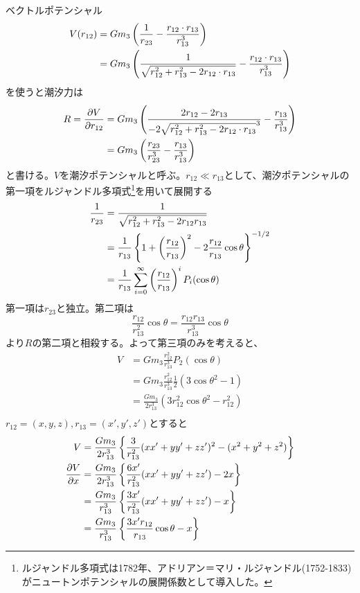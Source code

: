     ベクトルポテンシャル
    \begin{align*}
        V(r_{12}) &= Gm_3\lr{ \frac{1}{r_{23}} - \frac{r_{12}\cdot r_{13}}{r_{13}^3} }\\
        &= Gm_3\lr{ \frac{1}{\sqrt{ r_{12}^2 + r_{13}^2 - 2r_{12}\cdot r_{13}}} - \frac{r_{12}\cdot r_{13}}{r_{13}^3} }\\
    \end{align*}
    を使うと潮汐力は
    \begin{align*}
        R = \pd[V]{r_{12}} &= Gm_3\lr{ \frac{2r_{12} - 2r_{13}}{-2\sqrt{ r_{12}^2 + r_{13}^2 - 2r_{12}\cdot r_{13}}^3} - \frac{r_{13}}{r_{13}^3} }\\
        &= Gm_3\lr{ \frac{r_{23}}{r_{23}^3} - \frac{r_{13}}{r_{13}^3} }
    \end{align*}
    と書ける。$V$を潮汐ポテンシャルと呼ぶ。$r_{12} \ll r_{13}$として、潮汐ポテンシャルの第一項をルジャンドル多項式\footnote{ルジャンドル多項式は1782年、アドリアン＝マリ・ルジャンドル(1752-1833)がニュートンポテンシャルの展開係数として導入した。}を用いて展開する
    \begin{align*}
        \frac{1}{r_{23}}
        &= \frac{1}{\sqrt{ r_{12}^2 + r_{13}^2 - 2r_{12}r_{13} }}\\
        &= \frac{1}{r_{13}}\mlr{ 1 + \lr{ \frac{r_{12}}{r_{13}} }^2 - 2\frac{r_{12}}{r_{13}}\cos\theta }^{-1/2}\\
        &= \frac{1}{r_{13}}\sum_{i = 0}^\infty \lr{\frac{r_{12}}{r_{13}}}^iP_i(\cos\theta)
    \end{align*}
    第一項は$r_{23}$と独立。第二項は
        \[\frac{r_{12}}{r_{13}^2}\cos\theta = \frac{r_{12}r_{13}}{r_{13}^3}\cos\theta\]
    より$R$の第二項と相殺する。よって第三項のみを考えると、
    \begin{align*}
        V &= Gm_3\frac{r_{12}^2}{r_{13}^3}P_2(\cos\theta)\\
        &= Gm_3\frac{r_{12}^2}{r_{13}^3}\frac{1}{2}(3\cos\theta^2 - 1)\\
        &= \frac{Gm_3}{2r_{13}^3}(3r_{12}^2\cos\theta^2 - r_{12}^2)\\
    \end{align*}
    $r_{12} = (x, y, z), r_{13} = (x', y', z')$とすると
    \begin{align*}
        V &= \frac{Gm_3}{2r_{13}^3}\mlr{ \frac{3}{r_{13}^2}(xx' + yy' + zz')^2 - (x^2 + y^2 + z^2) }\\
        \pd[V]{x} &= \frac{Gm_3}{2r_{13}^3}\mlr{ \frac{6x'}{r_{13}^2
        }(xx' + yy' + zz') - 2x }\\
        &= \frac{Gm_3}{r_{13}^3}\mlr{ \frac{3x'}{r_{13}^2}(xx' + yy' + zz') - x }\\
        &= \frac{Gm_3}{r_{13}^3}\mlr{ \frac{3x'r_{12}}{r_{13}}\cos\theta - x }\\
    \end{align*}
